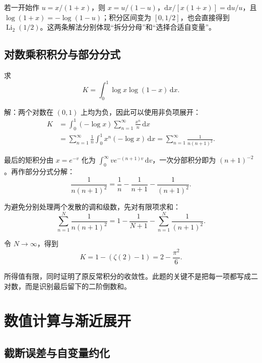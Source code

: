 \documentclass[11pt,a4paper]{article}
\begin{document}
若一开始作 \(u=x/(1+x)\)，则
\(x=u/(1-u)\)，\(\mathrm dx/[x(1+x)]=\mathrm du/u\)，且
\(\log(1+x)=-\log(1-u)\)；积分区间变为 \([0,1/2]\)，也会直接得到
\(\operatorname{Li}_2(1/2)\)。这两条解法分别体现``拆分分母''和``选择合适自变量''。

\hypertarget{ux5bf9ux6570ux4e58ux79efux79efux5206ux4e0eux90e8ux5206ux5206ux5f0f}{%
\subsection{对数乘积积分与部分分式}\label{ux5bf9ux6570ux4e58ux79efux79efux5206ux4e0eux90e8ux5206ux5206ux5f0f}}

求
\[
K=\int_0^1\log x\log(1-x)\,\mathrm dx.
\]

解：两个对数在 \((0,1)\) 上均为负，因此可以使用非负项展开：
\[
\begin{aligned}
K&=\int_0^1(-\log x)\sum_{n=1}^{\infty}\frac{x^n}n\,\mathrm dx\\
&=\sum_{n=1}^{\infty}\frac1n\int_0^1x^n(-\log x)\,\mathrm dx
=\sum_{n=1}^{\infty}\frac1{n(n+1)^2}.
\end{aligned}
\]

最后的矩积分由 \(x=e^{-v}\) 化为
\(\int_0^{\infty}ve^{-(n+1)v}\,\mathrm dv\)，一次分部积分即为
\((n+1)^{-2}\)。再作部分分式分解：
\[
\frac1{n(n+1)^2}=\frac1n-\frac1{n+1}-\frac1{(n+1)^2}.
\]

为避免分别处理两个发散的调和级数，先对有限项求和：
\[
\sum_{n=1}^{N}\frac1{n(n+1)^2}
=1-\frac1{N+1}-\sum_{n=1}^{N}\frac1{(n+1)^2}.
\]

令 \(N\to\infty\)，得到
\[
K=1-(\zeta(2)-1)=2-\frac{\pi^2}{6}.
\]

所得值有限，同时证明了原反常积分的收敛性。此题的关键不是把每一项都写成二对数，而是识别最后留下的二阶倒数和。

\hypertarget{ux6570ux503cux8ba1ux7b97ux4e0eux6e10ux8fd1ux5c55ux5f00}{%
\section{数值计算与渐近展开}\label{ux6570ux503cux8ba1ux7b97ux4e0eux6e10ux8fd1ux5c55ux5f00}}

\hypertarget{ux622aux65adux8befux5deeux4e0eux81eaux53d8ux91cfux7ea6ux5316}{%
\subsection{截断误差与自变量约化}\label{ux622aux65adux8befux5deeux4e0eux81eaux53d8ux91cfux7ea6ux5316}}
\end{document}
